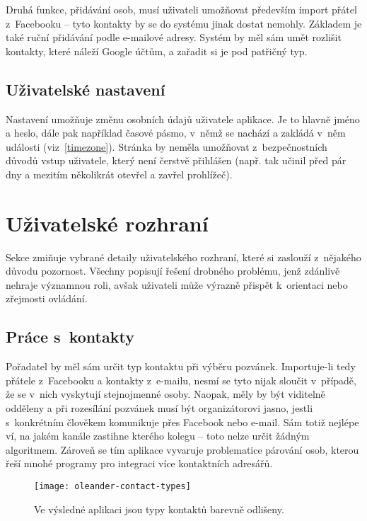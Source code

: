 \documentclass[12pt,oneside,final]{fithesis2}
\begin{document}
Druhá funkce, přidávání osob, musí uživateli umožňovat především import přátel z~Facebooku -- tyto kontakty by se do systému jinak dostat nemohly. Základem je také ruční přidávání podle e-mailové adresy. Systém by měl sám umět rozlišit kontakty, které náleží Google účtům, a zařadit si je pod patřičný typ.

\subsection{Uživatelské nastavení}
Nastavení umožňuje změnu osobních údajů uživatele aplikace. Je to hlavně jméno a heslo, dále pak například časové pásmo, v~němž se nachází a zakládá v~něm události (viz~\ref{timezone}). Stránka by neměla umožňovat z~bezpečnostních důvodů vstup uživatele, který není čerstvě přihlášen (např. tak učinil před pár dny a mezitím několikrát otevřel a zavřel prohlížeč).


\section{Uživatelské rozhraní}
Sekce zmiňuje vybrané detaily uživatelského rozhraní, které si zaslouží z~nějakého důvodu pozornost. Všechny popisují řešení drobného problému, jenž zdánlivě nehraje významnou roli, avšak uživateli může výrazně přispět k~orientaci nebo zřejmosti ovládání.

\subsection{Práce s~kontakty}\label{separateContactTypes}
Pořadatel by měl sám určit typ kontaktu při výběru pozvánek. Im\-por\-tu\-je-li tedy přátele z~Facebooku a kontakty z~e-mailu, nesmí se tyto nijak sloučit v~případě, že se v~nich vyskytují stejnojmenné osoby. Naopak, měly by být viditelně odděleny a při rozesílání pozvánek musí být organizátorovi jasno, jestli s~konkrétním člověkem komunikuje přes Facebook nebo e-mail. Sám totiž nejlépe ví, na jakém kanále zastihne kterého kolegu -- toto nelze určit žádným algoritmem. Zároveň se tím aplikace vyvaruje problematice párování osob, kterou řeší mnohé programy pro integraci více kontaktních adresářů.

\begin{figure}[H]
    \centering
    \texttt{[image: oleander-contact-types]}
    \caption{Ve výsledné aplikaci jsou typy kontaktů barevně odlišeny.}
\end{figure}
\end{document}
